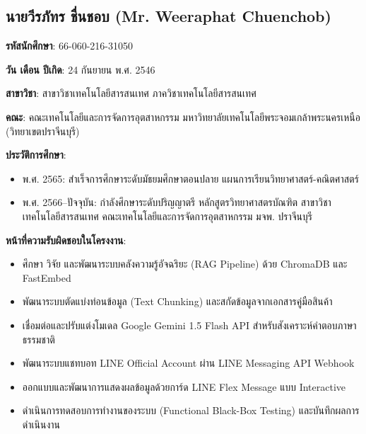 \subsection{นายวีรภัทร ชื่นชอบ (Mr. Weeraphat Chuenchob)}
\begin{mycustomitem}
\item \textbf{รหัสนักศึกษา}: 66-060-216-31050
\item \textbf{วัน เดือน ปีเกิด}: 24 กันยายน พ.ศ. 2546
\item \textbf{สาขาวิชา}: สาขาวิชาเทคโนโลยีสารสนเทศ ภาควิชาเทคโนโลยีสารสนเทศ
\item \textbf{คณะ}: คณะเทคโนโลยีและการจัดการอุตสาหกรรม มหาวิทยาลัยเทคโนโลยีพระจอมเกล้าพระนครเหนือ (วิทยาเขตปราจีนบุรี)
\item \textbf{ประวัติการศึกษา}:
  \begin{itemize}[leftmargin=2em,noitemsep,topsep=2pt]
    \item พ.ศ. 2565: สำเร็จการศึกษาระดับมัธยมศึกษาตอนปลาย แผนการเรียนวิทยาศาสตร์-คณิตศาสตร์
    \item พ.ศ. 2566--ปัจจุบัน: กำลังศึกษาระดับปริญญาตรี หลักสูตรวิทยาศาสตรบัณฑิต สาขาวิชาเทคโนโลยีสารสนเทศ คณะเทคโนโลยีและการจัดการอุตสาหกรรม มจพ. ปราจีนบุรี
  \end{itemize}
\item \textbf{หน้าที่ความรับผิดชอบในโครงงาน}:
  \begin{itemize}[leftmargin=2em,noitemsep,topsep=2pt]
    \item ศึกษา วิจัย และพัฒนาระบบคลังความรู้อัจฉริยะ (RAG Pipeline) ด้วย ChromaDB และ FastEmbed
    \item พัฒนาระบบตัดแบ่งท่อนข้อมูล (Text Chunking) และสกัดข้อมูลจากเอกสารคู่มือสินค้า
    \item เชื่อมต่อและปรับแต่งโมเดล Google Gemini 1.5 Flash API สำหรับสังเคราะห์คำตอบภาษาธรรมชาติ
    \item พัฒนาระบบแชทบอท LINE Official Account ผ่าน LINE Messaging API Webhook
    \item ออกแบบและพัฒนาการแสดงผลข้อมูลด้วยการ์ด LINE Flex Message แบบ Interactive
    \item ดำเนินการทดสอบการทำงานของระบบ (Functional Black-Box Testing) และบันทึกผลการดำเนินงาน
  \end{itemize}
\end{mycustomitem}
